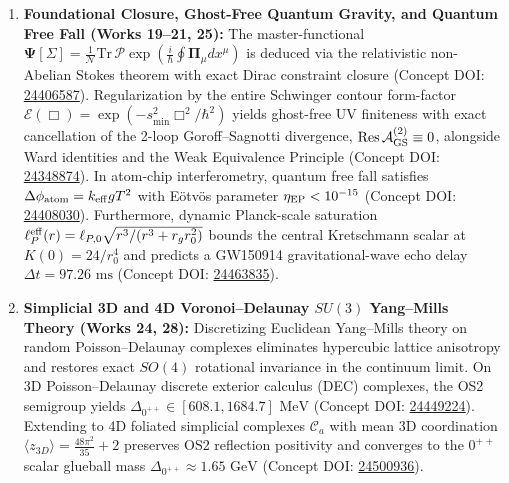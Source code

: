\documentclass[11pt,a4paper]{article}
\theoremstyle{definition}
\begin{document}
\begin{enumerate}
\item \textbf{Foundational Closure, Ghost-Free Quantum Gravity, and Quantum Free Fall (Works 19--21, 25):}
The master-functional $\mathbf{\Psi}[\Sigma] = \frac{1}{\mathcal{N}}\mathrm{Tr}\,\mathcal{P}\exp(\frac{i}{\hbar}\oint \mathbf{\Pi}_\mu dx^\mu)$ is deduced via the relativistic non-Abelian Stokes theorem with exact Dirac constraint closure (Concept DOI: \href{https://doi.org/10.5281/zenodo.24406587}{24406587}). Regularization by the entire Schwinger contour form-factor $\mathcal{E}(\Box) = \exp(-s_{\min}^2 \Box^2/\hbar^2)$ yields ghost-free UV finiteness with exact cancellation of the 2-loop Goroff--Sagnotti divergence, $\mathrm{Res}\,\mathcal{A}_{\rm GS}^{(2)} \equiv 0$, alongside Ward identities and the Weak Equivalence Principle (Concept DOI: \href{https://doi.org/10.5281/zenodo.24348874}{24348874}). In atom-chip interferometry, quantum free fall satisfies $\Delta\phi_{\rm atom} = k_{\rm eff} g T^2$ with E\"otv\"os parameter $\eta_{\rm EP} < 10^{-15}$ (Concept DOI: \href{https://doi.org/10.5281/zenodo.24408030}{24408030}). Furthermore, dynamic Planck-scale saturation $\ell_P^{\rm eff}(r) = \ell_{P,0}\sqrt{r^3/(r^3 + r_g r_0^2)}$ bounds the central Kretschmann scalar at $K(0) = 24/r_0^4$ and predicts a GW150914 gravitational-wave echo delay $\Delta t = 97.26\text{ ms}$ (Concept DOI: \href{https://doi.org/10.5281/zenodo.24463835}{24463835}).

\item \textbf{Simplicial 3D and 4D Voronoi--Delaunay $SU(3)$ Yang--Mills Theory (Works 24, 28):}
Discretizing Euclidean Yang--Mills theory on random Poisson--Delaunay complexes eliminates hypercubic lattice anisotropy and restores exact $SO(4)$ rotational invariance in the continuum limit. On 3D Poisson--Delaunay discrete exterior calculus (DEC) complexes, the OS2 semigroup yields $\Delta_{0^{++}} \in [608.1, 1684.7]\text{ MeV}$ (Concept DOI: \href{https://doi.org/10.5281/zenodo.24449224}{24449224}). Extending to 4D foliated simplicial complexes $\mathcal{C}_a$ with mean 3D coordination $\langle z_{3D}\rangle = \frac{48\pi^2}{35}+2$ preserves OS2 reflection positivity and converges to the $0^{++}$ scalar glueball mass $\Delta_{0^{++}} \approx 1.65\text{ GeV}$ (Concept DOI: \href{https://doi.org/10.5281/zenodo.24500936}{24500936}).


\end{enumerate}
\end{document}
